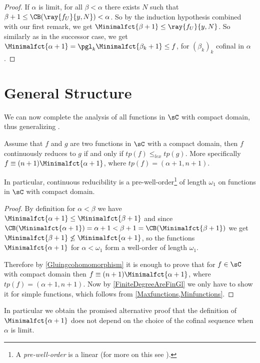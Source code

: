 \begin{proof}
If $\alpha$ is limit, for all $\beta< \alpha$ there exists $N$ such that $\beta+1\leq \CB(\ray{f_{U}}{y,N})< \alpha$. So by the induction hypothesis combined with our first remark, we get $\Minimalfct{\beta+1}\leq \ray{f_{U}}{y,N}$.
So similarly as in the successor case, we get $\Minimalfct{\alpha+1}=\pgl_{k}\Minimalfct{\beta_k+1}\leq f$, for $(\beta_k)_k$ cofinal in $\alpha$.
\end{proof}



\section{General Structure}

We can now complete the analysis of all functions in $\sC$ with compact domain, thus generalizing \cite[Theorem 4.2]{carroy2013quasi}.

\begin{theorem}\label{Compactdomains}
Assume that $f$ and $g$ are two functions in $\sC$ with a compact domain, then $f$ continuously reduces to $g$ if and only if $tp(f)\leq_{lex}tp(g)$.
More specifically $f\equiv(n+1)\Minimalfct{\alpha+1}$, where $tp(f)=(\alpha+1,n+1)$.

In particular, continuous reducibility is a pre-well-order\footnote{A \emph{pre-well-order} is a linear \wqo{} (for more on this see \cite[Section 34.A]{kechris}).}
of length $\omega_1$ on functions in $\sC$ with compact domain.
\end{theorem}

\begin{proof}
By definition for $\alpha<\beta$ we have $\Minimalfct{\alpha+1}\leq\Minimalfct{\beta+1}$ and since $\CB(\Minimalfct{\alpha+1})=\alpha+1<\beta+1=\CB(\Minimalfct{\beta+1})$
we get $\Minimalfct{\beta+1}\not\leq\Minimalfct{\alpha+1}$, so the functions $\Minimalfct{\alpha+1}$ for $\alpha<\omega_1$ form a well-order of length $\omega_1$.

Therefore by \cref{Gluingcohomomorphism} it is enough to prove that for $f\in\sC$ with compact domain then $f\equiv(n+1)\Minimalfct{\alpha+1}$, where $tp(f)=(\alpha+1,n+1)$.
Now by \cref{FiniteDegreeAreFinGl} we only have to show it for simple functions, which follows from \cref{Maxfunctions,Minfunctions}.
\end{proof}

In particular we obtain the promised alternative proof that the definition of $\Minimalfct{\alpha+1}$ does not depend on the choice of the cofinal sequence when $\alpha$ is limit.

